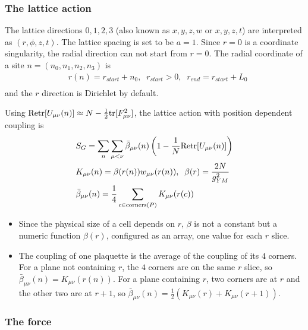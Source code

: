 \subsubsection{\label{sec:CylinderLatticeAction}The lattice action}

The lattice directions $0,1,2,3$ (also known as $x,y,z,w$ or $x,y,z,t$) are interpreted as $(r,\phi,z,t)$. The lattice spacing is set to be $a=1$. Since $r=0$ is a coordinate singularity, the radial direction can not start from $r=0$. The radial coordinate of a site $n=(n_0,n_1,n_2,n_3)$ is
\begin{equation}
\begin{split}
&r(n)=r_{start}+n_0,\;\;r_{start}>0,\;\;r_{end}=r_{start}+L_0\\
\end{split}
\end{equation}
and the $r$ direction is Dirichlet by default.

Using ${\rm Re} {\rm tr} [U_{\mu\nu}(n)]\approx N-\frac{1}{2}{\rm tr}[F_{\mu\nu}^2]$, the lattice action with position dependent coupling is
\begin{equation}
\begin{split}
&S_G=\sum _{n}\sum _{\mu<\nu}\bar{\beta}_{\mu\nu}(n)\left(1-\frac{1}{N}{\rm Re} {\rm tr}[U_{\mu\nu}(n)]\right)\\
&K_{\mu\nu}(n)=\beta (r(n))w_{\mu\nu}(r(n)),\;\;\beta (r)=\frac{2N}{g_{YM}^2}\\
&\bar{\beta}_{\mu\nu}(n)=\frac{1}{4}\sum _{c\in {\rm corners}(P)}K_{\mu\nu}(r(c))\\
\end{split}
\end{equation}

\begin{itemize}
  \item Since the physical size of a cell depends on $r$, $\beta$ is not a constant but a numeric function $\beta (r)$, configured as an array, one value for each $r$ slice.
  \item The coupling of one plaquette is the average of the coupling of its $4$ corners. For a plane not containing $r$, the $4$ corners are on the same $r$ slice, so $\bar{\beta}_{\mu\nu}(n)=K_{\mu\nu}(r(n))$. For a plane containing $r$, two corners are at $r$ and the other two are at $r+1$, so $\bar{\beta}_{\mu\nu}(n)=\frac{1}{2}\left(K_{\mu\nu}(r)+K_{\mu\nu}(r+1)\right)$.
\end{itemize}

\subsubsection{\label{sec:CylinderForce}The force}

